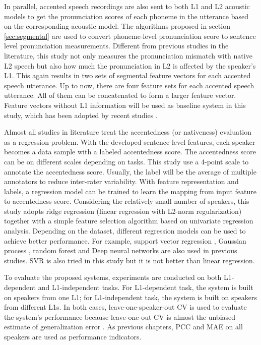 In parallel, accented speech recordings are also sent to both L1 and L2 acoustic models to get the pronunciation scores of each phoneme in the utterance based on the corresponding acoustic model. The algorithms proposed in section \ref{sec:segmental} are used to convert phoneme-level pronunciation score to sentence level pronunciation measurements. Different from previous studies in the literature, this study not only measures the pronunciation mismatch with native L2 speech but also how much the pronunciation in L2 is affected by the speaker's L1. This again results in two sets of segmental feature vectors for each accented speech utterance. Up to now, there are four feature sets for each accented speech utterance. All of them can be concatenated to form a larger feature vector. Feature vectors without L1 information will be used as baseline system in this study, which has been adopted by recent studies \citep{black2015automated, tao2016exploring, qian2017bidirectional}.

Almost all studies in literature treat the accentedness (or nativeness) evaluation as a regression problem. With the developed sentence-level features, each speaker becomes a data sample with a labeled accentedness score. The accentedness score can be on different scales depending on tasks. This study use a 4-point scale to annotate the accentedness score. Usually, the label will be the average of multiple annotators to reduce inter-rater variability. With feature representation and labels, a regression model can be trained to learn the mapping from input feature to accentedness score. Considering the relatively small number of speakers, this study adopts ridge regression (linear regression with L2-norm regularization) together with a simple feature selection algorithm based on univariate regression analysis. Depending on the dataset, different regression models can be used to achieve better performance. For example, support vector regression \citep{black2015automated}, Gaussian process \citep{grosz2015assessing}, random forest \citep{qian2017bidirectional} and Deep neural networks \citep{grosz2015assessing} are also used in previous studies. SVR is also tried in this study but it is not better than linear regression.

To evaluate the proposed systems, experiments are conducted on both L1-dependent and L1-independent tasks. For L1-dependent task, the system is built on speakers from one L1; for L1-independent task, the system is built on speakers from different L1s. In both cases, leave-one-speaker-out CV is used to evaluate the system's performance because leave-one-out CV is almost the unbiased estimate of generalization error \citep{elisseeff2003leave}. As previous chapters, PCC and MAE on all speakers are used as performance indicators.

